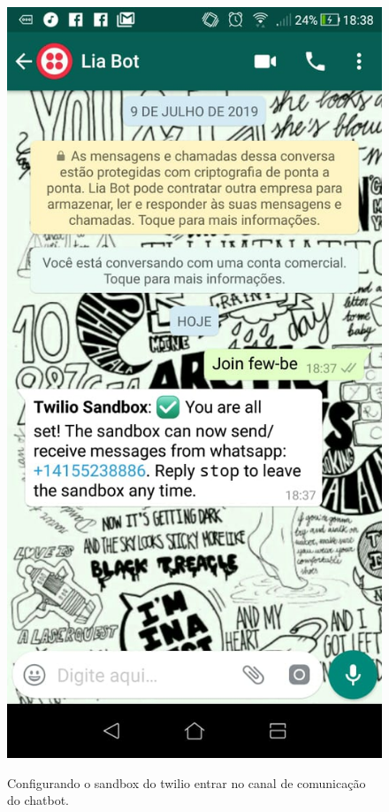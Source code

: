 \begin{figure}[H]
  \centering
   \caption{Configurando o sandbox do twilio entrar no canal de comunicação do chatbot.}
  \includegraphics[scale=0.35]{Imagens/twilio-sandbox.jpeg} 
  \label{twilio-sandbox}
\end{figure}


